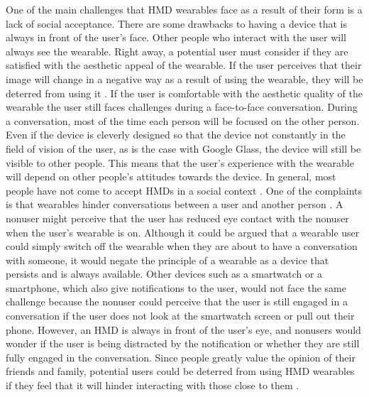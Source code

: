 \documentclass[11pt]{article}
\begin{document}
One of the main challenges that HMD wearables face as a result of their form is a lack of social acceptance. There are some drawbacks to having a device that is always in front of the user's face. Other people who interact with the user will always see the wearable. Right away, a potential user must consider if they are satisfied with the aesthetic appeal of the wearable. If the user perceives that their image will change in a negative way as a result of using the wearable, they will be deterred from using it \cite{WearableHumanView}. If the user is comfortable with the aesthetic quality of the wearable the user still faces challenges during a face-to-face conversation. During a conversation, most of the time each person will be focused on the other person. Even if the device is cleverly designed so that the device not constantly in the field of vision of the user, as is the case with Google Glass, the device will still be visible to other people. This means that the user's experience with the wearable will depend on other people's attitudes towards the device. In general, most people have not come to accept HMDs in a social context \cite{negativeGlassReactions}. One of the complaints is that wearables hinder conversations between a user and another person \cite{wearableFaceToFace}. A nonuser might perceive that the user has reduced eye contact with the nonuser when the user's wearable is on. Although it could be argued that a wearable user could simply switch off the wearable when they are about to have a conversation with someone, it would negate the principle of a wearable as a device that persists and is always available. Other devices such as a smartwatch or a smartphone, which also give notifications to the user, would not face the same challenge because the nonuser could perceive that the user is still engaged in a conversation if the user does not look at the smartwatch screen or pull out their phone. However, an HMD is always in front of the user's eye, and nonusers would wonder if the user is being distracted by the notification or whether they are still fully engaged in the conversation. Since people greatly value the opinion of their friends and family, potential users could be deterred from using HMD wearables if they feel that it will hinder interacting with those close to them \cite{WearableHumanView}. 
\end{document}
